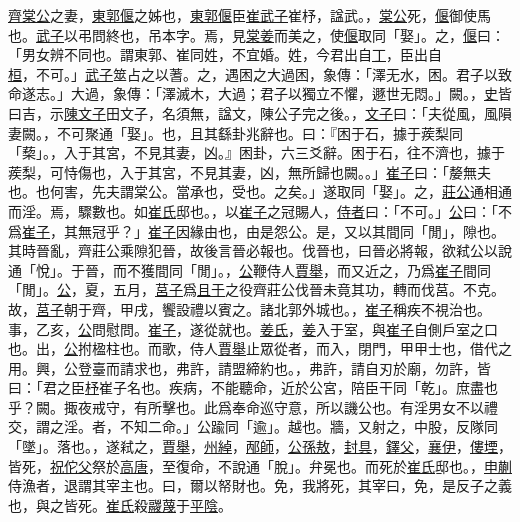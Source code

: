 \documentclass{article}
\newcommand{\tsu}{\small\kaishu\color{brown}}
\begin{document}
\uline{齊棠公}之妻，\uline{東郭偃}之姊也，\uline{東郭偃}臣\uline{崔武子}{\tsu 崔杼，諡武。}，\uline{棠公}死，\uline{偃}御{\tsu 使馬也。}\uline{武子}以弔{\tsu 問終也，吊本字。}焉，見\uline{棠姜}而美之，使\uline{偃}取{\tsu 同「娶」。}之，\uline{偃}曰：「男女辨{\tsu 不同也。謂東郭、崔同姓，不宜婚。}姓，今君出自\uline{丁}，臣出自\uline{桓}，不可。」\uline{武子}筮{\tsu 占之以蓍。}之，遇困之大過{\tsu 困，象傳：「澤无水，困。君子以致命遂志。」大過，象傳：「澤滅木，大過；君子以獨立不懼，遯世无悶。」闕。}，\uline{史}皆曰吉，示\uline{陳文子}{\tsu 田文子，名須無，諡文，陳公子完之後。}，\uline{文子}曰：「夫從風，風隕妻{\tsu 闕。}，不可聚{\tsu 通「娶」。}也，且其繇{\tsu 卦兆辭也。}曰：『困于石，據于蒺梨{\tsu 同「蔾」。}，入于其宮，不見其妻，凶。』{\tsu 困卦，六三爻辭。}困于石，往不濟也，據于蒺梨，可恃傷也，入于其宮，不見其妻，凶，無所歸也{\tsu 闕。}。」\uline{崔子}曰：「嫠{\tsu 無夫也。}也何害，先夫{\tsu 謂棠公。}當{\tsu 承也，受也。}之矣。」遂取{\tsu 同「娶」。}之，\uline{莊公}通{\tsu 相通而淫。}焉，驟{\tsu 數也。}如\uline{崔氏}{\tsu 邸也。}，以\uline{崔子}之冠賜人，\uline{侍者}曰：「不可。」\uline{公}曰：「不爲\uline{崔子}，其無冠乎？」\uline{崔子}因{\tsu 緣由也，由是怨公。}是，又以其間{\tsu 同「閒」，隙也。其時晉亂，齊莊公乘隙犯晉，故後言晉必報也。}伐晉也，曰晉必將報，欲弒公以說{\tsu 通「悅」。}于晉，而不獲間{\tsu 同「閒」。}，\uline{公}鞭侍人\uline{賈舉}，而又近之，乃爲\uline{崔子}間{\tsu 同「閒」。}\uline{公}，夏，五月，\uline{莒子}爲\uline{且于}之役{\tsu 齊莊公伐晉未竟其功，轉而伐莒。不克。}故，\uline{莒子}朝于齊，甲戌，饗{\tsu 設禮以賓之。}諸北郭{\tsu 外城也。}，\uline{崔子}稱疾不視{\tsu 治也。}事，乙亥，\uline{公}問{\tsu 慰問。}\uline{崔子}，遂從{\tsu 就也。}\uline{姜氏}，\uline{姜}入于室，與\uline{崔子}自側戶{\tsu 室之口也。}出，\uline{公}拊楹{\tsu 柱也。}而歌，侍人\uline{賈舉}止眾從者，而入，閉門，甲{\tsu 甲士也，借代之用。}興，公登臺而請{\tsu 求也}，弗許，請盟{\tsu 締約也。}，弗許，請自刃於廟，勿許，皆曰：「君之臣\uline{杼}{\tsu 崔子名也。}疾病，不能聽命，近於公宮，陪臣干{\tsu 同「乾」。庶盡也乎？闕。}掫{\tsu 夜戒守，有所擊也。此爲奉命巡守意，所以譏公也。}有淫{\tsu 男女不以禮交，謂之淫。}者，不知二命。」公踰{\tsu 同「逾」。越也。}牆，又射之，中股，反隊{\tsu 同「墜」。落也。}，遂弒之，\uline{賈舉}，\uline{州綽}，\uline{邴師}，\uline{公孫敖}，\uline{封具}，\uline{鐸父}，\uline{襄伊}，\uline{僂堙}，皆死，\uline{祝佗父}祭於\uline{高唐}，至復命，不說{\tsu 通「脫」。}弁{\tsu 冕也。}而死於\uline{崔氏}{\tsu 邸也。}，\uline{申蒯}侍漁者，退謂其宰{\tsu 主也。}曰，爾以帑{\tsu 財也。}免，我將死，其宰曰，免，是反子之義也，與之皆死。\uline{崔氏}殺\uline{鬷蔑}于\uline{平陰}。
\end{document}
